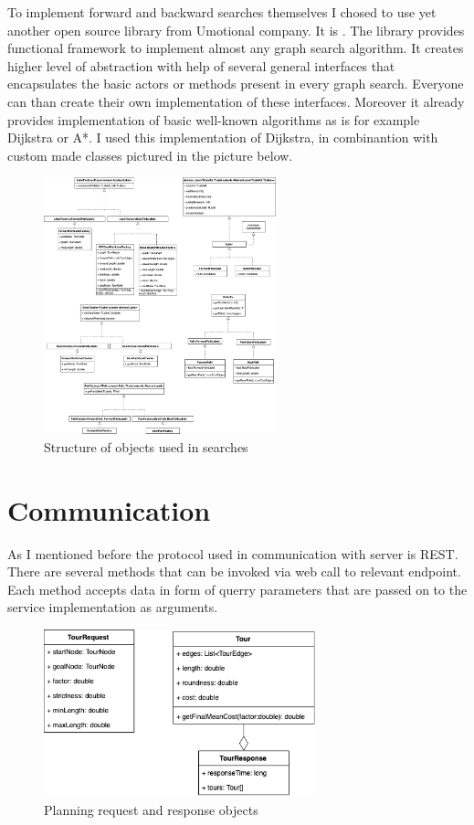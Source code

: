 \documentclass{ctuthesis}
\begin{document}
To implement forward and backward searches themselves I chosed to use yet another open source library from Umotional company. It is . The library provides functional framework to implement almost any graph search algorithm. It creates higher level of abstraction with help of several general interfaces that encapsulates the basic actors or methods present in every graph search. Everyone can than create their own implementation of these interfaces. Moreover it already provides implementation of basic well-known algorithms as is for example Dijkstra or A*. I used this implementation of Dijkstra, in combinantion with custom made classes pictured in the picture below. 

\begin{figure}[H]
	\includegraphics[width=0.6\textwidth]{search.png}
	\caption{Structure of objects used in searches}
\end{figure}



\section{Communication}
As I mentioned before the protocol used in communication with server is REST. There are several methods that can be invoked via web call to relevant endpoint. Each method accepts data in form of querry parameters that are passed on to the service implementation as arguments.

\begin{figure}[H]
	\includegraphics[width=0.7\textwidth]{api.png}
	\caption{Planning request and response objects}
\end{figure}
\end{document}
